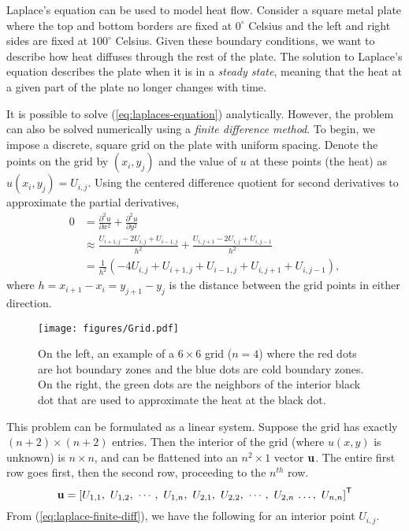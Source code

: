 Laplace's equation can be used to model heat flow.
Consider a square metal plate where the top and bottom borders are fixed at $0^\circ$ Celsius and the left and right sides are fixed at $100^\circ$ Celsius.
Given these boundary conditions, we want to describe how heat diffuses through the rest of the plate.
The solution to Laplace's equation describes the plate when it is in a \emph{steady state}, meaning that the heat at a given part of the plate no longer changes with time.

It is possible to solve (\ref{eq:laplaces-equation}) analytically.
However, the problem can also be solved numerically using a \emph{finite difference method}.
To begin, we impose a discrete, square grid on the plate with uniform spacing.
Denote the points on the grid by $(x_i,y_j)$ and the value of $u$ at these points (the heat) as $u(x_i,y_j) = U_{i,j}$.
Using the centered difference quotient for second derivatives to approximate the partial derivatives,
%
\begin{align}
\nonumber 0 &= \frac{\partial^2 u}{\partial x^2}+ \frac{\partial^2 u}{\partial y^2}\\
\nonumber &\approx \frac{U_{i+1,j}-2U_{i,j}+U_{i-1,j}}{h^2} + \frac{U_{i,j+1}-2U_{i,j}+U_{i,j-1}}{h^2}\\
&= \frac{1}{h^2}\left(-4U_{i,j} + U_{i+1,j} + U_{i-1,j} + U_{i,j+1} +  U_{i,j-1}\right),
\label{eq:laplace-finite-diff}
\end{align}
where $h = x_{i+1} - x_i = y_{j+1} - y_j$ is the distance between the grid points in either direction.
%
\begin{figure}
    \texttt{[image: figures/Grid.pdf]}
    \caption{On the left, an example of a $6\times 6$ grid ($n=4$) where the red dots are hot boundary zones and the blue dots are cold boundary zones.
    On the right, the green dots are the neighbors of the interior black dot that are used to approximate the heat at the black dot.}
    \label{fig:itersolve-finite-difference-grid}
\end{figure}
%
This problem can be formulated as a linear system.
Suppose the grid has exactly $(n+2)\times (n+2)$ entries.
Then the interior of the grid (where $u(x,y)$ is unknown) is $n\times n$, and can be flattened into an $n^2\times 1$ vector $\mathbf{u}$.
The entire first row goes first, then the second row, proceeding to the $n^{th}$ row.
\[\u = \left[U_{1,1},\ U_{1,2},\ \cdots,\ U_{1,n},\ U_{2,1},\ U_{2,2},\ \cdots,\ U_{2,n}\, \ldots,\ U_{n,n}\right]\trp\]
From (\ref{eq:laplace-finite-diff}), we have the following for an interior point $U_{i,j}$.
